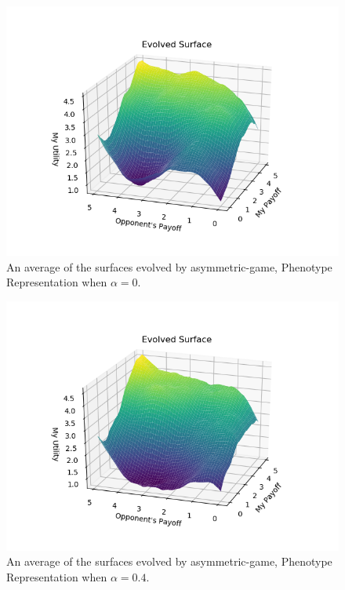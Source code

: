 \documentclass[11pt]{book}
\begin{document}
\begin{figure}
	\centering
	\includegraphics[scale=0.7]{resources/asymmetric_average_evolved_surface_r_00.png}
	\caption{An average of the surfaces evolved by asymmetric-game, Phenotype Representation when $\alpha = 0$.}
	\label{average_r_0_asymmetric_evolved}
\end{figure}

\begin{figure}
	\centering
	\includegraphics[scale=0.6]{resources/asymmetric_average_evolved_surface_r_04.png}
	\caption{An average of the surfaces evolved by asymmetric-game, Phenotype Representation when $\alpha = 0.4$.}
	\label{average_r_04_asymmetric_evolved}
\end{figure}
\end{document}
